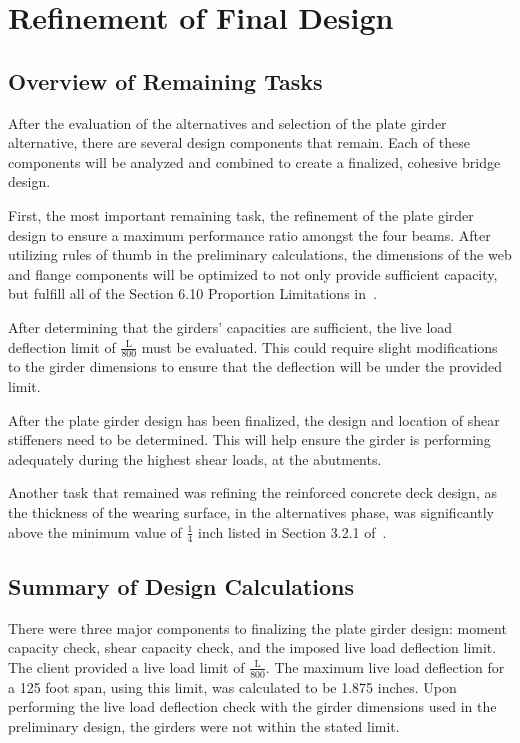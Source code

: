 \chapter{Refinement of Final Design}

\section{Overview of Remaining Tasks}
After the evaluation of the alternatives and selection of the plate girder alternative, there are several design components that remain. Each of these components will be analyzed and combined to create a finalized, cohesive bridge design.

First, the most important remaining task, the refinement of the plate girder design to ensure a maximum performance ratio amongst the four beams. After utilizing rules of thumb in the preliminary calculations, the dimensions of the web and flange components will be optimized to not only provide sufficient capacity, but fulfill all of the Section 6.10 Proportion Limitations in~\cite{aashto7}.

After determining that the girders' capacities are sufficient, the live load deflection limit of \(\frac{\textrm{L}}{800}\) must be evaluated. This could require slight modifications to the girder dimensions to ensure that the deflection will be under the provided limit.

After the plate girder design has been finalized, the design and location of shear stiffeners need to be determined. This will help ensure the girder is performing adequately during the highest shear loads, at the abutments.

Another task that remained was refining the reinforced concrete deck design, as the thickness of the wearing surface, in the alternatives phase, was significantly above the minimum value of \(\frac{1}{4}\) inch listed in Section 3.2.1 of~\cite{bridgedesignman}.


\section{Summary of Design Calculations}

There were three major components to finalizing the plate girder design: moment capacity check, shear capacity check, and the imposed live load deflection limit. The client provided a live load limit of \(\frac{\textrm{L}}{800}\). The maximum live load deflection for a 125 foot span, using this limit, was calculated to be 1.875 inches. Upon performing the live load deflection check with the girder dimensions used in the preliminary design, the girders were not within the stated limit.

